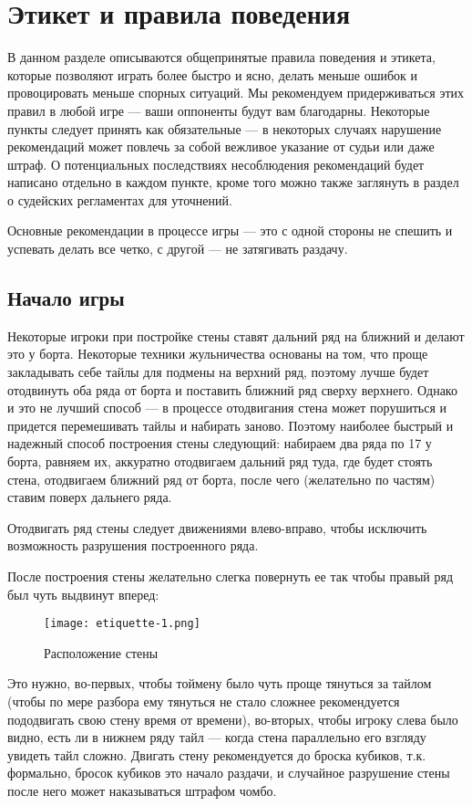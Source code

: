 \section{Этикет и правила поведения}

В данном разделе описываются общепринятые правила поведения и этикета, которые позволяют играть более быстро и ясно, делать меньше ошибок и провоцировать меньше спорных ситуаций. Мы рекомендуем придерживаться этих правил в любой игре --- ваши оппоненты будут вам благодарны. Некоторые пункты следует принять как обязательные --- в некоторых случаях нарушение рекомендаций может повлечь за собой вежливое указание от судьи или даже штраф. О потенциальных последствиях несоблюдения рекомендаций будет написано отдельно в каждом пункте, кроме того можно также заглянуть в раздел о судейских регламентах для уточнений.

Основные рекомендации в процессе игры --- это с одной стороны не спешить и успевать делать все четко, с другой --- не затягивать раздачу. 

\subsection {Начало игры}

Некоторые игроки при постройке стены ставят дальний ряд на ближний и делают это у борта. Некоторые техники жульничества основаны на том, что проще закладывать себе тайлы для подмены на верхний ряд, поэтому лучше будет отодвинуть оба ряда от борта и поставить ближний ряд сверху верхнего. Однако и это не лучший способ --- в процессе отодвигания стена может порушиться и придется перемешивать тайлы и набирать заново. Поэтому наиболее быстрый и надежный способ построения стены следующий: набираем два ряда по 17 у борта, равняем их, аккуратно отодвигаем дальний ряд туда, где будет стоять стена, отодвигаем ближний ряд от борта, после чего (желательно по частям) ставим поверх дальнего ряда. 

Отодвигать ряд стены следует движениями влево-вправо, чтобы исключить возможность разрушения построенного ряда.

После построения стены желательно слегка повернуть ее так чтобы правый ряд был чуть выдвинут вперед:

\begin{figure}[H]
	\centering
	\texttt{[image: etiquette-1.png]}
	\caption{Расположение стены}
\end{figure}

Это нужно, во-первых, чтобы тоймену было чуть проще тянуться за тайлом (чтобы по мере разбора ему тянуться не стало сложнее рекомендуется пододвигать свою стену время от времени), во-вторых, чтобы игроку слева было видно, есть ли в нижнем ряду тайл --- когда стена параллельно его взгляду увидеть тайл сложно. Двигать стену рекомендуется до броска кубиков, т.к. формально, бросок кубиков это начало раздачи, и случайное разрушение стены после него может наказываться штрафом чомбо. 

